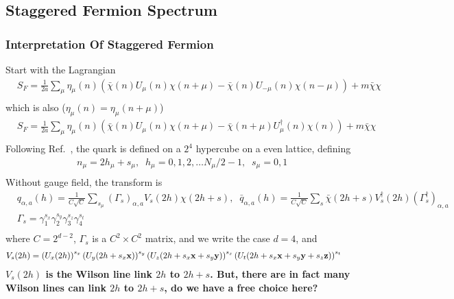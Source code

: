 \subsection{\label{StaggeredFermionSpectrum}Staggered Fermion Spectrum}

\subsubsection{\label{InterpretationOfStaggeredFermion}Interpretation Of Staggered Fermion}

Start with the Lagrangian
\begin{equation}
\begin{split}
&S_F=\frac{1}{2a}\sum _{\mu}\eta _{\mu}(n)\left(\bar{\chi} (n)U_{\mu}(n) \chi(n+\mu) - \bar{\chi}(n) U_{-\mu}(n)\chi(n-\mu)\right)+m\bar{\chi}\chi\\
\end{split}
\end{equation}
which is also ($\eta _{\mu}(n)=\eta _{\mu}(n+\mu)$) 
\begin{equation}
\begin{split}
&S_F=\frac{1}{2a}\sum _{\mu}\eta _{\mu}(n)\left(\bar{\chi} (n)U_{\mu}(n) \chi(n+\mu) - \bar{\chi}(n+\mu) U_{\mu}^{\dagger}(n)\chi(n)\right)+m\bar{\chi}\chi\\
\end{split}
\end{equation}
Following Ref.~\cite{staggeredQuarks}, the quark is defined on a $2^4$ hypercube on a even lattice, defining
\begin{equation}
\begin{split}
&n_{\mu}=2h_{\mu}+s_{\mu},\;\;h_{\mu}=0,1,2,\ldots N_{\mu}/2-1,\;\;s_{\mu}=0,1\\
\end{split}
\end{equation}
Without gauge field, the transform is
\begin{equation}
\begin{split}
&q_{\alpha,a}(h)=\frac{1}{C\sqrt{C}}\sum _{s_{\mu}} (\Gamma _{s})_{\alpha,a}V_{s}(2h)\chi (2h+s),\;\;\bar{q}_{\alpha,a}(h)=\frac{1}{C\sqrt{C}}\sum _{s} \bar{\chi} (2h+s)V^{\dagger}_{s}(2h)(\Gamma _{s}^{\dagger})_{\alpha,a}\\
&\Gamma _{s}=\gamma _1^{s_x}\gamma _2^{s_y}\gamma _3^{s_z}\gamma _4^{s_t}\\
\end{split}
\end{equation}
where $C=2^{d-2}$, $\Gamma _{s}$ is a $C^2 \times C^2$ matrix, and we write the case $d=4$, and
\begin{equation}
\begin{split}
&V_{s}(2h)=\left(U_{x}(2h)\right)^{s_x}\left(U_{y}(2h+s_x{\bf x})\right)^{s_y}\left(U_{z}(2h +s_x{\bf x}+s_y{\bf y})\right)^{s_z}\left(U_{t}(2h+s_x{\bf x}+s_y{\bf y}+s_z{\bf z})\right)^{s_t}
\end{split}
\end{equation}
\textbf{$V_s(2h)$ is the Wilson line link $2h$ to $2h+s$. But, there are in fact many Wilson lines can link $2h$ to $2h+s$, do we have a free choice here?}

